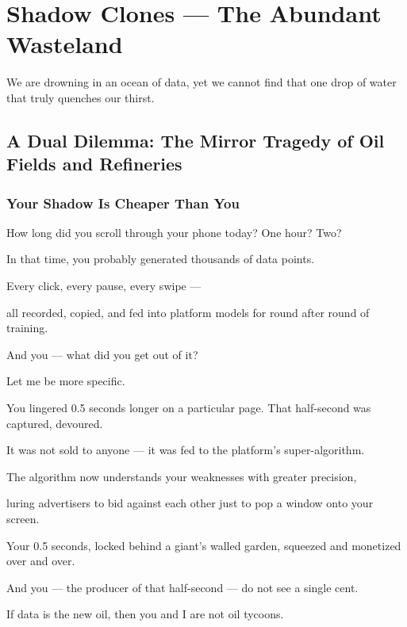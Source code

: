 \chapter{Shadow Clones --- The Abundant Wasteland}

\begin{myquote}
We are drowning in an ocean of data, yet we cannot find that one drop of water that truly quenches our thirst.
\end{myquote}

\section{A Dual Dilemma: The Mirror Tragedy of Oil Fields and Refineries}

\subsection{Your Shadow Is Cheaper Than You}

How long did you scroll through your phone today? One hour? Two?

In that time, you probably generated thousands of data points.

Every click, every pause, every swipe ---

all recorded, copied, and fed into platform models for round after round of training.

And you --- what did you get out of it?

\vspace{1em}

Let me be more specific.

You lingered 0.5 seconds longer on a particular page. That half-second was captured, devoured.

It was not sold to anyone --- it was fed to the platform's super-algorithm.

The algorithm now understands your weaknesses with greater precision,

luring advertisers to bid against each other just to pop a window onto your screen.

Your 0.5 seconds, locked behind a giant's walled garden, squeezed and monetized over and over.

And you --- the producer of that half-second --- do not see a single cent.

\vspace{1em}

If data is the new oil, then you and I are not oil tycoons.

